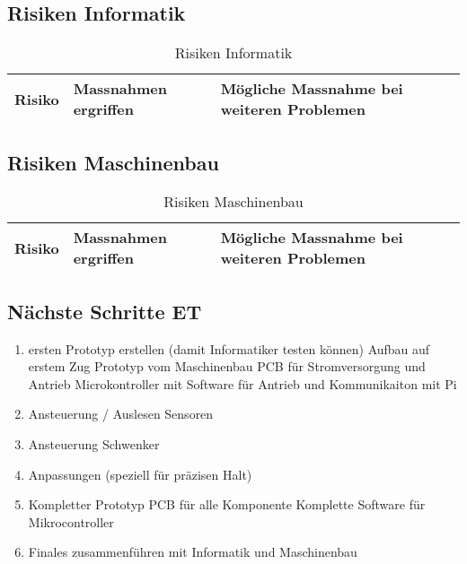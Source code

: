 \documentclass[../../main.tex]{subfiles}
\begin{document}
    \subsection{Risiken Informatik}
    \begin{table}[H]
        \begin{tabular}{|p{}|p{}|p{}|}
    \hline
    \textbf{Risiko}                                            & \textbf{Massnahmen ergriffen}                                                                         & \textbf{Mögliche Massnahme bei weiteren Problemen} \\ \hline
    \end{tabular}
    \caption{Risiken Informatik}
    \label{tab:risk_I}
    \end{table}

    \subsection{Risiken Maschinenbau}
    \begin{table}[H]
        \begin{tabular}{|p{}|p{}|p{}|}
        \hline
        \textbf{Risiko}                                            & \textbf{Massnahmen ergriffen}                                                                         & \textbf{Mögliche Massnahme bei weiteren Problemen} \\ \hline
        \end{tabular}
        \caption{Risiken Maschinenbau}
        \label{tab:risk_M}
        \end{table}

\subsection{Nächste Schritte ET}
\begin{enumerate}
    \item ersten Prototyp erstellen (damit Informatiker testen können)
        \subitem Aufbau auf erstem Zug Prototyp vom Maschinenbau
        \subitem PCB für Stromversorgung und Antrieb
        \subitem Microkontroller mit Software für Antrieb und Kommunikaiton mit Pi 
    \item Ansteuerung / Auslesen Sensoren
    \item Ansteuerung Schwenker
    \item Anpassungen (speziell für präzisen Halt)
    \item Kompletter Prototyp
        \subitem PCB für alle Komponente
        \subitem Komplette Software für Mikrocontroller
    \item Finales zusammenführen mit Informatik und Maschinenbau
\end{enumerate}
\end{document}
